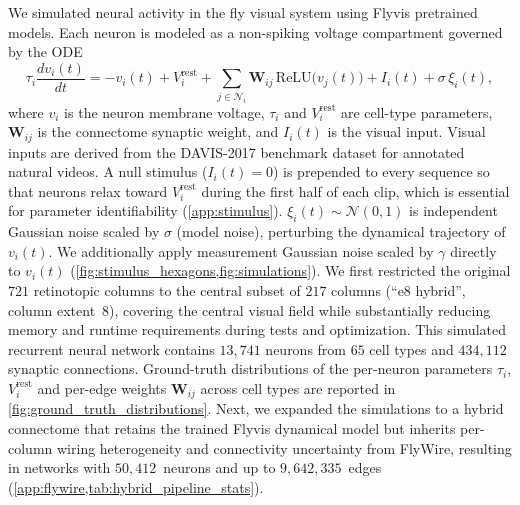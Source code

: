 \documentclass{article}
\begin{document}
We simulated neural activity in the fly visual system using Flyvis pretrained models.  Each neuron is modeled as a non-spiking voltage compartment governed by the ODE
\begin{equation}
\tau_i\frac{dv_i(t)}{dt} = -v_i(t) + V_i^{\text{rest}}
+ \sum_{j\in\mathcal{N}_i}\mathbf{W}_{ij}\,\text{ReLU}\!\big(v_j(t)\big)
+ I_i(t) + \sigma\,\xi_i(t),
\label{eq:simulated_update}
\end{equation}
where $v_i$ is the neuron membrane voltage, $\tau_i$ and
$V_i^{\mathrm{rest}}$ are cell-type parameters, $\mathbf{W}_{ij}$ is the
connectome synaptic weight, and $I_i(t)$ is the visual input. Visual
inputs are derived from the DAVIS-2017 benchmark dataset
\citep{perazzi_benchmark_2016} for annotated
natural videos. A null
stimulus ($I_i(t)=0$) is prepended to every sequence so that neurons
relax toward $V_i^{\mathrm{rest}}$ during the first half of each clip,
which is essential for parameter identifiability
(\cref{app:stimulus}). $\xi_i(t)\sim\mathcal{N}(0,1)$ is
independent Gaussian noise scaled by $\sigma$ (model noise), perturbing
the dynamical trajectory of $v_i(t)$. We additionally apply
measurement Gaussian noise scaled by
$\gamma$ directly to $v_i(t)$ (\cref{fig:stimulus_hexagons,fig:simulations}).  We first restricted the original $721$
retinotopic columns to the central subset of $217$
columns (``e8 hybrid'', column extent~8), covering the central visual field while substantially reducing memory and runtime requirements during tests and optimization. This simulated recurrent neural network contains $13{,}741$ neurons from $65$ cell types and $434{,}112$ synaptic connections. Ground-truth distributions of the per-neuron parameters $\tau_i$, $V_i^{\mathrm{rest}}$ and per-edge weights $\mathbf{W}_{ij}$ across cell types are reported in \cref{fig:ground_truth_distributions}. Next, we expanded the simulations to a hybrid connectome that retains the trained Flyvis dynamical model but inherits per-column wiring heterogeneity and connectivity uncertainty from FlyWire, resulting in networks with $50{,}412$~neurons and up to $9{,}642{,}335$~edges (\cref{app:flywire,tab:hybrid_pipeline_stats}).
\end{document}
